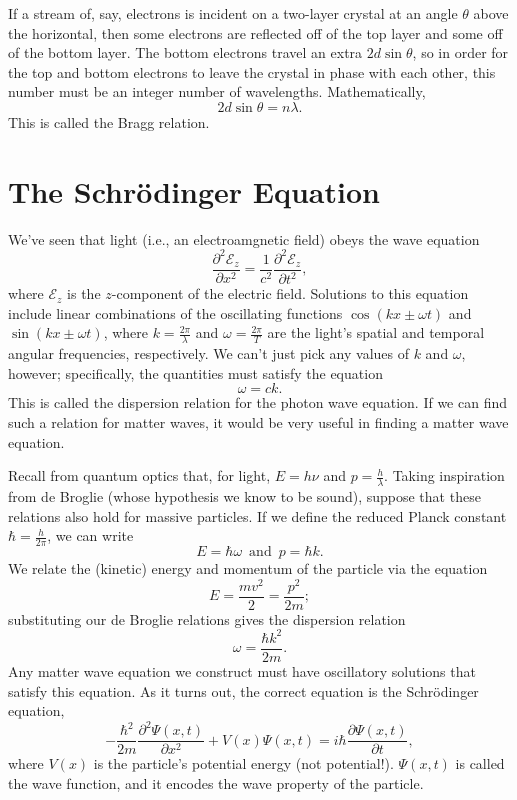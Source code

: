 \documentclass[../p052main.tex]{subfiles}
\begin{document}
If a stream of, say, electrons is incident on a two-layer crystal at an angle $\theta$ above the horizontal, then some electrons are reflected off of the top layer and some off of the bottom layer.
The bottom electrons travel an extra $2d\sin\theta$, so in order for the top and bottom electrons to leave the crystal in phase with each other, this number must be an integer number of wavelengths.
Mathematically,
\[ 2d \sin\theta = n \lambda. \]
This is called the Bragg relation.

\section{The Schrödinger Equation}%
We've seen that light (i.e., an electroamgnetic field) obeys the wave equation
\[ \frac{\partial^2 \mathcal{E}_z}{\partial x^2} = \frac{1}{c^2} \frac{\partial^2 \mathcal{E}_z}{\partial t^2}, \]
where $\mathcal{E}_z$ is the $z$-component of the electric field.
Solutions to this equation include linear combinations of the oscillating functions $\cos (kx \pm \omega t)$ and $\sin (kx \pm \omega t)$, where $k = \frac{2\pi}{\lambda}$ and $\omega = \frac{2\pi}{T}$ are the light's spatial and temporal angular frequencies, respectively.
We can't just pick any values of $k$ and $\omega$, however; specifically, the quantities must satisfy the equation
\[ \omega = ck. \]
This is called the dispersion relation for the photon wave equation.
If we can find such a relation for matter waves, it would be very useful in finding a matter wave equation.

Recall from quantum optics that, for light, $E = h\nu$ and $p = \frac{h}{\lambda}$.
Taking inspiration from de Broglie (whose hypothesis we know to be sound), suppose that these relations also hold for massive particles.
If we define the reduced Planck constant $\hbar = \frac{h}{2\pi}$, we can write
\[ E = \hbar \omega \,\text{ and }\, p = \hbar k. \]
We relate the (kinetic) energy and momentum of the particle via the equation
\[ E = \frac{mv^2}{2} = \frac{p^2}{2m}; \]
substituting our de Broglie relations gives the dispersion relation
\[ \omega = \frac{\hbar k^2}{2m}. \]
Any matter wave equation we construct must have oscillatory solutions that satisfy this equation.
As it turns out, the correct equation is the Schrödinger equation,
\[ -\frac{\hbar^2}{2m} \frac{\partial^2 \Psi(x,t)}{\partial x^2} + V(x) \Psi(x,t) = i \hbar \frac{\partial \Psi(x,t)}{\partial t}, \]
where $V(x)$ is the particle's potential energy (not potential!).
$\Psi(x,t)$ is called the wave function, and it encodes the wave property of the particle.
\end{document}
